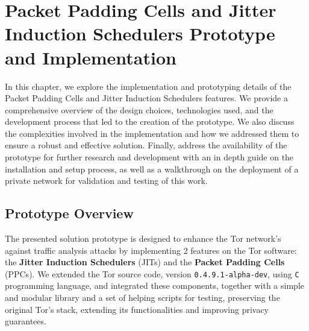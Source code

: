 
%

\chapter{Packet Padding Cells and Jitter Induction Schedulers Prototype and Implementation}\label{cha:implementation}

In this chapter, we explore the implementation and prototyping details of the Packet Padding Cells and Jitter Induction Schedulers features. We provide a comprehensive overview of the design choices, technologies used, and the development process that led to the creation of the prototype. We also discuss the complexities involved in the implementation and how we addressed them to ensure a robust and effective solution.
Finally, address the availability of the prototype for further research and development with an in depth guide on the installation and setup process, as well as a walkthrough on the deployment of a private network for validation and testing of this work.

\section{Prototype Overview}\label{sec:prototype_overview}

The presented solution prototype is designed to enhance the Tor network's against traffic analysis attacks by implementing 2 features on the Tor software: the \textbf{Jitter Induction Schedulers} (JITs) and the \textbf{Packet Padding Cells} (PPCs). We extended the Tor source code, version \texttt{0.4.9.1-alpha-dev}, using \texttt{C} programming language, and integrated these components, together with a simple and modular library and a set of helping scripts for testing, preserving the original Tor's stack, extending its functionalities and improving privacy guarantees.

